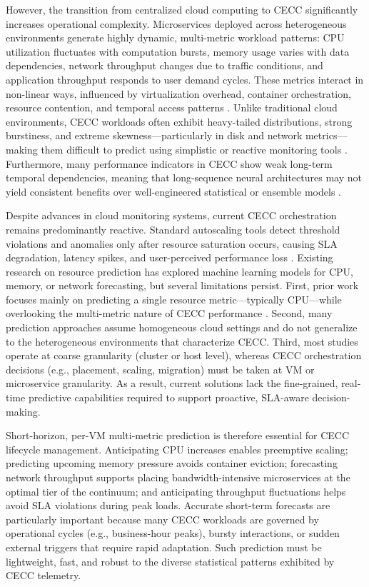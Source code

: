 \documentclass[a4paper,fleqn]{cas-dc}
\begin{document}
However, the transition from centralized cloud computing to CECC significantly increases operational complexity. Microservices deployed across heterogeneous environments generate highly dynamic, multi-metric workload patterns: CPU utilization fluctuates with computation bursts, memory usage varies with data dependencies, network throughput changes due to traffic conditions, and application throughput responds to user demand cycles. These metrics interact in non-linear ways, influenced by virtualization overhead, container orchestration, resource contention, and temporal access patterns \cite{b4}. Unlike traditional cloud environments, CECC workloads often exhibit heavy-tailed distributions, strong burstiness, and extreme skewness---particularly in disk and network metrics---making them difficult to predict using simplistic or reactive monitoring tools \cite{b5}. Furthermore, many performance indicators in CECC show weak long-term temporal dependencies, meaning that long-sequence neural architectures may not yield consistent benefits over well-engineered statistical or ensemble models \cite{b6}.

Despite advances in cloud monitoring systems, current CECC orchestration remains predominantly reactive. Standard autoscaling tools detect threshold violations and anomalies only after resource saturation occurs, causing SLA degradation, latency spikes, and user-perceived performance loss \cite{b7}. Existing research on resource prediction has explored machine learning models for CPU, memory, or network forecasting, but several limitations persist. First, prior work focuses mainly on predicting a single resource metric---typically CPU---while overlooking the multi-metric nature of CECC performance \cite{b8}. Second, many prediction approaches assume homogeneous cloud settings and do not generalize to the heterogeneous environments that characterize CECC. Third, most studies operate at coarse granularity (cluster or host level), whereas CECC orchestration decisions (e.g., placement, scaling, migration) must be taken at VM or microservice granularity. As a result, current solutions lack the fine-grained, real-time predictive capabilities required to support proactive, SLA-aware decision-making.

Short-horizon, per-VM multi-metric prediction is therefore essential for CECC lifecycle management. Anticipating CPU increases enables preemptive scaling; predicting upcoming memory pressure avoids container eviction; forecasting network throughput supports placing bandwidth-intensive microservices at the optimal tier of the continuum; and anticipating throughput fluctuations helps avoid SLA violations during peak loads. Accurate short-term forecasts are particularly important because many CECC workloads are governed by operational cycles (e.g., business-hour peaks), bursty interactions, or sudden external triggers that require rapid adaptation. Such prediction must be lightweight, fast, and robust to the diverse statistical patterns exhibited by CECC telemetry.
\end{document}
